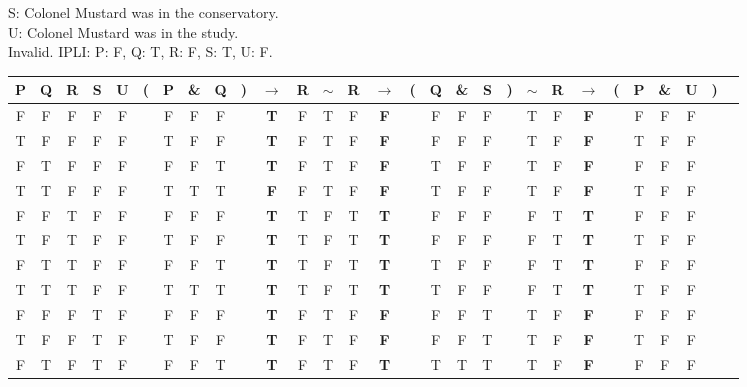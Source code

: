 \documentclass[a4paper,12pt]{article}
\newcommand{\mra}{$\rightarrow$ }
\newcommand{\ms}{$\sim$}
\begin{document}
\begin{enumerate}[label=\arabic*,leftmargin=*]
\begin{enumerate}[label=(\roman*)]
\begin{minipage}{\textwidth}
                    S: Colonel Mustard was in the conservatory.\\
                    U: Colonel Mustard was in the study.\\
                    Invalid. IPLI: P: F, Q: T, R: F, S: T, U: F.
                    \vspace{1em}\\
                    \hspace*{-3.5cm}
\begin{tabular}{c c c c c | c c c c c c c | c c c c c c c c | c c c c c c c c c}
P & Q & R & S & U & ( & P & \& & Q & ) & \mra & R & \ms & R & \mra & ( & Q & \& & S & ) & \ms & R & \mra & ( & P & \& & U & )\\
\hline
F & F & F & F & F &   & F & F  & F &   & \textbf{T} & F & T  & F & \textbf{F} &   & F & F  & F &   & T  & F & \textbf{F} &   & F & F  & F &  \\
T & F & F & F & F &   & T & F  & F &   & \textbf{T} & F & T  & F & \textbf{F} &   & F & F  & F &   & T  & F & \textbf{F} &   & T & F  & F &  \\
F & T & F & F & F &   & F & F  & T &   & \textbf{T} & F & T  & F & \textbf{F} &   & T & F  & F &   & T  & F & \textbf{F} &   & F & F  & F &  \\
T & T & F & F & F &   & T & T  & T &   & \textbf{F} & F & T  & F & \textbf{F} &   & T & F  & F &   & T  & F & \textbf{F} &   & T & F  & F &  \\
F & F & T & F & F &   & F & F  & F &   & \textbf{T} & T & F  & T & \textbf{T} &   & F & F  & F &   & F  & T & \textbf{T} &   & F & F  & F &  \\
T & F & T & F & F &   & T & F  & F &   & \textbf{T} & T & F  & T & \textbf{T} &   & F & F  & F &   & F  & T & \textbf{T} &   & T & F  & F &  \\
F & T & T & F & F &   & F & F  & T &   & \textbf{T} & T & F  & T & \textbf{T} &   & T & F  & F &   & F  & T & \textbf{T} &   & F & F  & F &  \\
T & T & T & F & F &   & T & T  & T &   & \textbf{T} & T & F  & T & \textbf{T} &   & T & F  & F &   & F  & T & \textbf{T} &   & T & F  & F &  \\
F & F & F & T & F &   & F & F  & F &   & \textbf{T} & F & T  & F & \textbf{F} &   & F & F  & T &   & T  & F & \textbf{F} &   & F & F  & F &  \\
T & F & F & T & F &   & T & F  & F &   & \textbf{T} & F & T  & F & \textbf{F} &   & F & F  & T &   & T  & F & \textbf{F} &   & T & F  & F &  \\
F & T & F & T & F &   & F & F  & T &   & \textbf{T} & F & T  & F & \textbf{T} &   & T & T  & T &   & T  & F & \textbf{F} &   & F & F  & F &  \\

\end{tabular}
\end{minipage}
\end{enumerate}
\end{enumerate}
\end{document}
